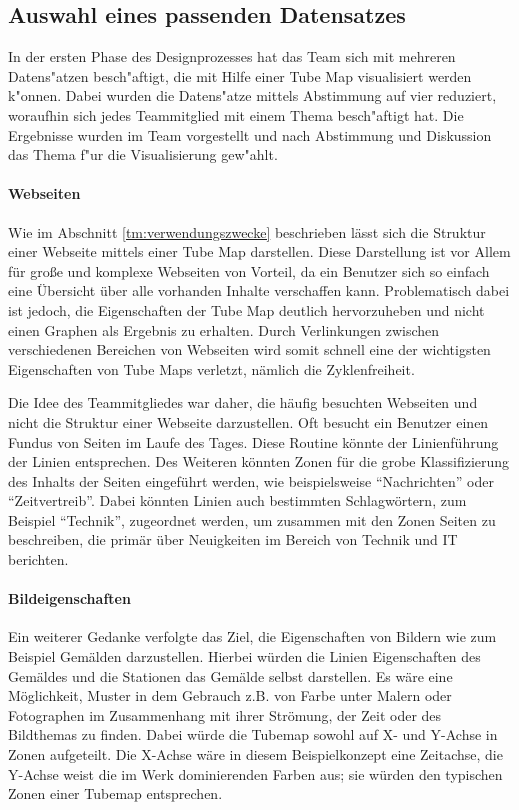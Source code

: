 \subsection{Auswahl eines passenden Datensatzes}
In der ersten Phase des Designprozesses hat das Team sich mit mehreren Datens"atzen besch"aftigt, die mit Hilfe einer Tube Map visualisiert werden k"onnen. Dabei wurden die Datens"atze mittels Abstimmung auf vier reduziert, woraufhin sich jedes Teammitglied mit einem Thema besch"aftigt hat. Die Ergebnisse wurden im Team vorgestellt und nach Abstimmung und Diskussion das Thema f"ur die Visualisierung gew"ahlt.

\paragraph{Webseiten}
Wie im Abschnitt \ref{tm:verwendungszwecke} beschrieben lässt sich die Struktur einer Webseite mittels einer Tube Map darstellen.  Diese Darstellung ist vor Allem für große und komplexe Webseiten von Vorteil, da ein Benutzer sich so einfach eine Übersicht über alle vorhanden Inhalte verschaffen kann. Problematisch dabei ist jedoch, die Eigenschaften der Tube Map deutlich hervorzuheben und nicht einen Graphen als Ergebnis zu erhalten. Durch Verlinkungen zwischen verschiedenen Bereichen von Webseiten wird somit schnell eine der wichtigsten Eigenschaften von Tube Maps verletzt, nämlich die Zyklenfreiheit.

Die Idee des Teammitgliedes war daher, die häufig besuchten Webseiten und nicht die Struktur einer Webseite darzustellen. Oft besucht ein Benutzer einen Fundus von Seiten im Laufe des Tages. Diese Routine könnte der Linienführung der Linien entsprechen. Des Weiteren könnten Zonen für die grobe Klassifizierung des Inhalts der Seiten eingeführt werden, wie beispielsweise "`Nachrichten"' oder "`Zeitvertreib"'. Dabei könnten Linien auch bestimmten Schlagwörtern, zum Beispiel "`Technik"', zugeordnet werden, um zusammen mit den Zonen Seiten zu beschreiben, die primär über Neuigkeiten im Bereich von Technik und IT berichten. 

\paragraph{Bildeigenschaften}
Ein weiterer Gedanke verfolgte das Ziel, die Eigenschaften von Bildern wie zum Beispiel Gemälden darzustellen. Hierbei würden die Linien Eigenschaften des Gemäldes und die Stationen das Gemälde selbst darstellen. Es wäre eine Möglichkeit, Muster in dem Gebrauch z.B. von Farbe unter Malern oder Fotographen im Zusammenhang mit ihrer Strömung, der Zeit oder des Bildthemas zu finden. Dabei würde die Tubemap sowohl auf X- und Y-Achse in Zonen aufgeteilt. Die X-Achse wäre in diesem Beispielkonzept eine Zeitachse, die Y-Achse weist die im Werk dominierenden Farben aus; sie würden den typischen Zonen einer Tubemap entsprechen.

